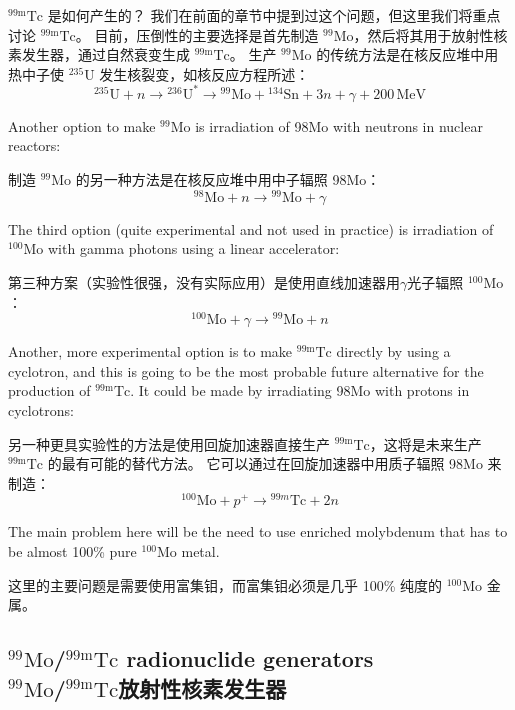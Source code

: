 \documentclass[dvipsnames, svgnames,a4paper,11pt]{article}
\begin{document}
${}^\mathrm{99m}\mathrm{Tc}$ 是如何产生的？ 我们在前面的章节中提到过这个问题，但这里我们将重点讨论 ${}^\mathrm{99m}\mathrm{Tc}$。 目前，压倒性的主要选择是首先制造 ${}^\mathrm{99}\mathrm{Mo}$，然后将其用于放射性核素发生器，通过自然衰变生成 ${}^\mathrm{99m}\mathrm{Tc}$。 生产 ${}^\mathrm{99}\mathrm{Mo}$ 的传统方法是在核反应堆中用热中子使 $\mathrm{{}^{235}U}$ 发生核裂变，如核反应方程所述：
$$
      {}^{235}\text{U} + n \rightarrow {}^{236}\text{U}^* \rightarrow {}^{99}\text{Mo} + {}^{134}\text{Sn} + 3n + \gamma + 200 \, \text{MeV}
$$

Another option to make ${}^\mathrm{99}\mathrm{Mo}$ is irradiation of 98Mo with neutrons in nuclear reactors:

制造 ${}^\mathrm{99}\mathrm{Mo}$ 的另一种方法是在核反应堆中用中子辐照 98Mo：
$$
      {}^{98}\text{Mo} + n \rightarrow {}^{99}\text{Mo} + \gamma
$$

The third option (quite experimental and not used in practice) is irradiation of $\mathrm{{}^{100}Mo}$
with gamma photons using a linear accelerator:

第三种方案（实验性很强，没有实际应用）是使用直线加速器用$\gamma$光子辐照 $\mathrm{{}^{100}Mo}$：
$$
      {}^{100}\text{Mo} + \gamma \rightarrow {}^{99}\text{Mo} + n
$$

Another, more experimental option is to make ${}^\mathrm{99m}\mathrm{Tc}$ directly by using a cyclotron,
and this is going to be the most probable future alternative for the production of ${}^\mathrm{99m}\mathrm{Tc}$.
It could be made by irradiating 98Mo with protons in cyclotrons:

另一种更具实验性的方法是使用回旋加速器直接生产 ${}^\mathrm{99m}\mathrm{Tc}$，这将是未来生产 ${}^\mathrm{99m}\mathrm{Tc}$ 的最有可能的替代方法。 它可以通过在回旋加速器中用质子辐照 98Mo 来制造：
$$
      {}^{100}\text{Mo} + p^+ \rightarrow {}^{99m}\text{Tc} + 2n
$$

The main problem here will be the need to use enriched molybdenum that has to be
almost 100\% pure $\mathrm{{}^{100}Mo}$ metal.

这里的主要问题是需要使用富集钼，而富集钼必须是几乎 100\% 纯度的 $\mathrm{{}^{100}Mo}$ 金属。
\subsection{${}^\mathrm{99}\mathrm{Mo}$/${}^\mathrm{99m}\mathrm{Tc}$ radionuclide generators \\${}^\mathrm{99}\mathrm{Mo}$/${}^\mathrm{99m}\mathrm{Tc}$放射性核素发生器}
\end{document}
